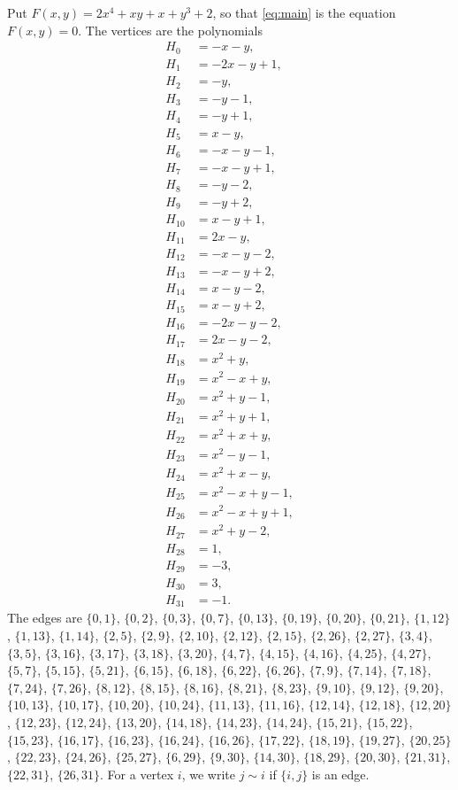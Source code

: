 \documentclass[11pt]{article}
\begin{document}
Put $F(x,y)=2x^{4}+xy+x+y^{3}+2$, so that \eqref{eq:main} is the equation $F(x,y)=0$. The vertices are the polynomials
\begin{align*}
H_{0}&=-x-y,\\
H_{1}&=-2x-y+1,\\
H_{2}&=-y,\\
H_{3}&=-y-1,\\
H_{4}&=-y+1,\\
H_{5}&=x-y,\\
H_{6}&=-x-y-1,\\
H_{7}&=-x-y+1,\\
H_{8}&=-y-2,\\
H_{9}&=-y+2,\\
H_{10}&=x-y+1,\\
H_{11}&=2x-y,\\
H_{12}&=-x-y-2,\\
H_{13}&=-x-y+2,\\
H_{14}&=x-y-2,\\
H_{15}&=x-y+2,\\
H_{16}&=-2x-y-2,\\
H_{17}&=2x-y-2,\\
H_{18}&=x^{2}+y,\\
H_{19}&=x^{2}-x+y,\\
H_{20}&=x^{2}+y-1,\\
H_{21}&=x^{2}+y+1,\\
H_{22}&=x^{2}+x+y,\\
H_{23}&=x^{2}-y-1,\\
H_{24}&=x^{2}+x-y,\\
H_{25}&=x^{2}-x+y-1,\\
H_{26}&=x^{2}-x+y+1,\\
H_{27}&=x^{2}+y-2,\\
H_{28}&=1,\\
H_{29}&=-3,\\
H_{30}&=3,\\
H_{31}&=-1.
\end{align*}
The edges are $\{0,1\}$, $\{0,2\}$, $\{0,3\}$, $\{0,7\}$, $\{0,13\}$, $\{0,19\}$, $\{0,20\}$, $\{0,21\}$, $\{1,12\}$, $\{1,13\}$, $\{1,14\}$, $\{2,5\}$, $\{2,9\}$, $\{2,10\}$, $\{2,12\}$, $\{2,15\}$, $\{2,26\}$, $\{2,27\}$, $\{3,4\}$, $\{3,5\}$, $\{3,16\}$, $\{3,17\}$, $\{3,18\}$, $\{3,20\}$, $\{4,7\}$, $\{4,15\}$, $\{4,16\}$, $\{4,25\}$, $\{4,27\}$, $\{5,7\}$, $\{5,15\}$, $\{5,21\}$, $\{6,15\}$, $\{6,18\}$, $\{6,22\}$, $\{6,26\}$, $\{7,9\}$, $\{7,14\}$, $\{7,18\}$, $\{7,24\}$, $\{7,26\}$, $\{8,12\}$, $\{8,15\}$, $\{8,16\}$, $\{8,21\}$, $\{8,23\}$, $\{9,10\}$, $\{9,12\}$, $\{9,20\}$, $\{10,13\}$, $\{10,17\}$, $\{10,20\}$, $\{10,24\}$, $\{11,13\}$, $\{11,16\}$, $\{12,14\}$, $\{12,18\}$, $\{12,20\}$, $\{12,23\}$, $\{12,24\}$, $\{13,20\}$, $\{14,18\}$, $\{14,23\}$, $\{14,24\}$, $\{15,21\}$, $\{15,22\}$, $\{15,23\}$, $\{16,17\}$, $\{16,23\}$, $\{16,24\}$, $\{16,26\}$, $\{17,22\}$, $\{18,19\}$, $\{19,27\}$, $\{20,25\}$, $\{22,23\}$, $\{24,26\}$, $\{25,27\}$, $\{6,29\}$, $\{9,30\}$, $\{14,30\}$, $\{18,29\}$, $\{20,30\}$, $\{21,31\}$, $\{22,31\}$, $\{26,31\}$. For a vertex $i$, we write $j\sim i$ if $\{i,j\}$ is an edge.
\end{document}
